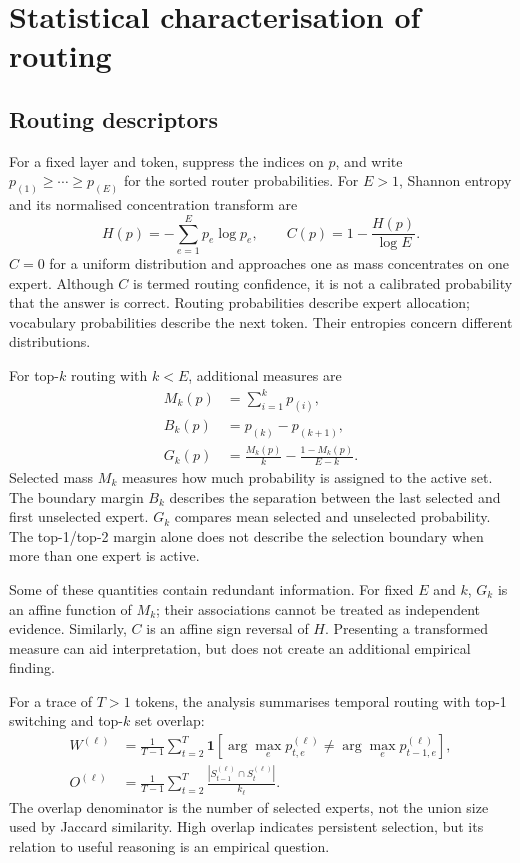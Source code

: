 \documentclass[12pt,a4paper,twoside,openright]{book}
\begin{document}
\section{Statistical characterisation of routing}
\label{sec:routing-measurement}

\subsection{Routing descriptors}

For a fixed layer and token, suppress the indices on $p$, and write
$p_{(1)}\geq\cdots\geq p_{(E)}$ for the sorted router probabilities.
For $E>1$, Shannon entropy and its normalised concentration transform are
\begin{equation}
  H(p)=-\sum_{e=1}^{E}p_e\log p_e,
  \qquad C(p)=1-\frac{H(p)}{\log E}.
  \label{eq:routing-entropy}
\end{equation}
$C=0$ for a uniform distribution and approaches one as mass concentrates on
one expert. Although $C$ is termed routing confidence, it is
not a calibrated probability that the answer is correct. Routing probabilities
describe expert allocation; vocabulary probabilities describe the next token.
Their entropies concern different distributions.

For top-$k$ routing with $k<E$, additional measures are
\begin{align}
  M_k(p) &= \sum_{i=1}^{k}p_{(i)}, \\
  B_k(p) &= p_{(k)}-p_{(k+1)}, \\
  G_k(p) &= \frac{M_k(p)}{k}-\frac{1-M_k(p)}{E-k}.
  \label{eq:topk-features}
\end{align}
Selected mass $M_k$ measures how much probability is assigned to the active
set. The boundary margin $B_k$ describes the separation between the last
selected and first unselected expert. $G_k$ compares mean selected and
unselected probability. The top-1/top-2 margin alone does not describe the
selection boundary when more than one expert is active.

Some of these quantities contain redundant information. For fixed $E$ and
$k$, $G_k$ is an affine function of $M_k$; their associations cannot be treated
as independent evidence. Similarly, $C$ is an affine sign reversal of $H$.
Presenting a transformed measure can aid interpretation, but does not create
an additional empirical finding.

For a trace of $T>1$ tokens, the analysis summarises temporal
routing with top-1 switching and top-$k$ set overlap:
\begin{align}
  W^{(\ell)} &= \frac{1}{T-1}\sum_{t=2}^{T}
  \mathbf{1}\!\left[\arg\max_e p_{t,e}^{(\ell)}
                 \neq \arg\max_e p_{t-1,e}^{(\ell)}\right], \\
  O^{(\ell)} &= \frac{1}{T-1}\sum_{t=2}^{T}
  \frac{|S_{t-1}^{(\ell)}\cap S_t^{(\ell)}|}{k_\ell}.
  \label{eq:routing-temporal}
\end{align}
The overlap denominator is the number of selected experts, not the union
size used by Jaccard similarity. High overlap indicates persistent selection,
but its relation to useful reasoning is an empirical question.
\end{document}
